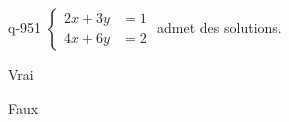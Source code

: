 \begin{truefalse}{q-951}
$\begin{cases}2x+3y &= 1 \\ 4x+6y &= 2\end{cases}$ admet des solutions.
\item* Vrai
\item Faux
\end{truefalse}

